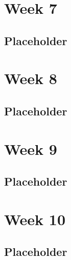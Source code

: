 \documentclass[11pt]{article}
\begin{document}

\newpage
\section{Week 7}

\subsection{Placeholder}


\newpage
\section{Week 8}

\subsection{Placeholder}


\newpage
\section{Week 9}

\subsection{Placeholder}


\newpage
\section{Week 10}

\subsection{Placeholder}

\end{document}

